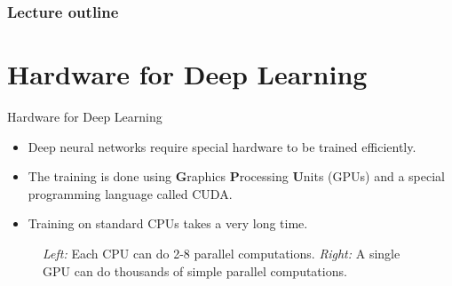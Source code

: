 








\begin{frame}
\frametitle{Lecture outline}
\tableofcontents
\end{frame}

\section{Hardware for Deep Learning}
\begin{frame} {Hardware for Deep Learning}
  \begin{itemize}
    \item Deep neural networks require special hardware to be trained efficiently.
    \item The training is done using \textbf{G}raphics \textbf{P}rocessing \textbf{U}nits (GPUs) and a special programming language called CUDA.
    \item Training on standard CPUs takes a very long time.
  \end{itemize}
\begin{figure}
    \centering
      \caption{\textit{Left:} Each CPU can do 2-8 parallel computations. \textit{Right:} A single GPU can do thousands of simple parallel computations.}
  \end{figure}
\end{frame}

